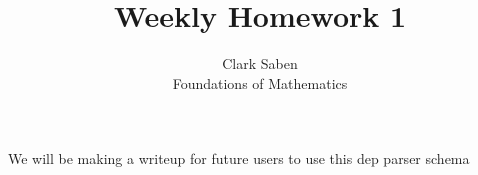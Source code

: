 \documentclass[12pt]{article}
\newenvironment{theorem}[2][Theorem]{\begin{trivlist}
\item[\hskip \labelsep {\bfseries #1}\hskip \labelsep {\bfseries #2.}]}{\end{trivlist}}
\begin{document}

\title{Weekly Homework 1}%
\author{Clark Saben\\ %
Foundations of Mathematics} %

\maketitle



\begin{theorem}{Proof of Concept}
     We will be making a writeup for future users to use this dep parser schema
\end{theorem}

\end{document}
